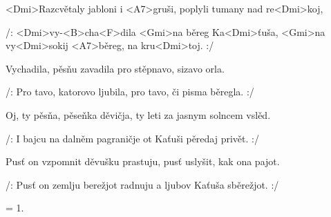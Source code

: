 


\zs



<Dmi>Razcvětaly jabloni i <A7>gruši, poplyli tumany nad 
re<Dmi>koj,

/: <Dmi>vy-<B>cha<F>dila <Gmi>na běreg Ka<Dmi>ťuša, 
<Gmi>na vy<Dmi>sokij <A7>běreg, na kru<Dmi>toj. :/
\ks

\zs


Vychadila, pěsňu zavadila pro stěpnavo, sizavo orla.

/: Pro tavo, katorovo ljubila, pro tavo, či pisma běregla. :/
\ks

\zs


Oj, ty pěsňa, pěseňka děvičja, ty leti za jasnym solncem vslěd.

/: I bajcu na dalněm pagraničje ot Kaťuši pěredaj privět. :/
\ks

\zs


Pusť on vzpomnit děvušku prastuju, pusť uslyšit, kak ona pajot.

/: Pusť on zemlju berežjot radnuju a ljubov Kaťuša sběrežjot. :/
\ks

\zs
= 1.
\ks

\kp



